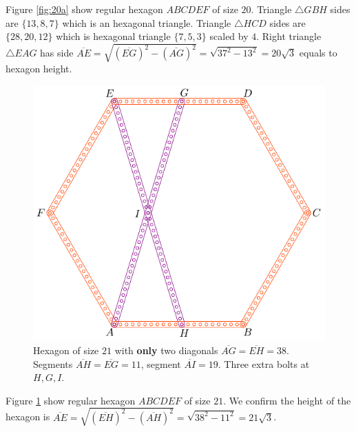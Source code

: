 \documentclass[11pt]{article}
\begin{document}
Figure \ref{fig:20a} show regular hexagon $ABCDEF$ of size $20$. Triangle $\triangle{GBH}$ sides are $\{13,8,7\}$ which is an hexagonal triangle. Triangle $\triangle{HCD}$ sides are $\{28,20,12\}$ which is hexagonal triangle $\{7,5,3\}$ scaled by $4$. Right triangle $\triangle{EAG}$ has side $\overline{AE} = \sqrt{(\overline{EG})^2 - (\overline{AG})^2} = \sqrt{37^2 - 13^2} = 20\sqrt3$ equals to hexagon height.

\begin{figure}[H]
\centering
\includegraphics[scale=1]{21/hexa-21a}
\caption{Hexagon of size $21$ with \textbf{only} two diagonals $\overline{AG} = \overline{EH} = 38$. Segments $\overline{AH} = \overline{EG} = 11$, segment $\overline{AI} = 19$. Three extra bolts at $H,G,I$.}
\label{fig:21a}
\end{figure}

Figure \ref{fig:21a} show regular hexagon $ABCDEF$ of size $21$. We confirm the height of the hexagon is $\overline{AE} = \sqrt{(\overline{EH})^2 - (\overline{AH})^2} = \sqrt{38^2 - 11^2} = 21\sqrt3$.
\end{document}
